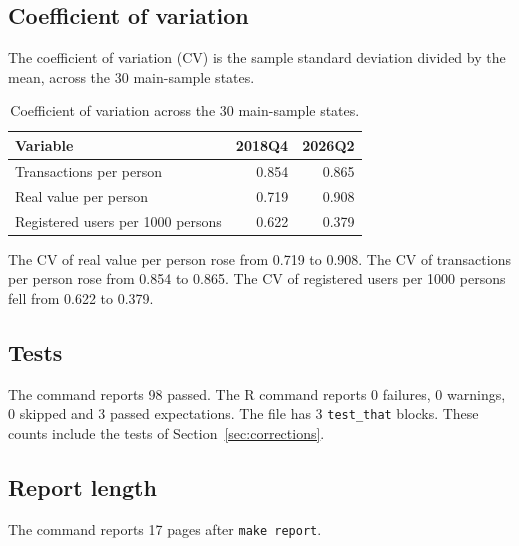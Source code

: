 \documentclass[11pt,a4paper]{article}
\begin{document}
\subsection{Coefficient of variation}
The coefficient of variation (CV) is the sample standard deviation divided by the mean, across the 30 main-sample states.
\begin{table}[h]
\centering
\caption{Coefficient of variation across the 30 main-sample states.}
\begin{tabular}{lrr}
\toprule
Variable & 2018Q4 & 2026Q2 \\
\midrule
Transactions per person & 0.854 & 0.865 \\
Real value per person & 0.719 & 0.908 \\
Registered users per 1000 persons & 0.622 & 0.379 \\
\bottomrule
\end{tabular}
\end{table}
The CV of real value per person rose from 0.719 to 0.908. The CV of transactions per person rose from 0.854 to 0.865. The CV of registered users per 1000 persons fell from 0.622 to 0.379.

\subsection{Tests}
The command  reports 98 passed. The R command  reports 0 failures, 0 warnings, 0 skipped and 3 passed expectations. The file  has 3 \texttt{test\_that} blocks. These counts include the tests of Section~\ref{sec:corrections}.

\subsection{Report length}
The command  reports 17 pages after \texttt{make report}.
\end{document}
